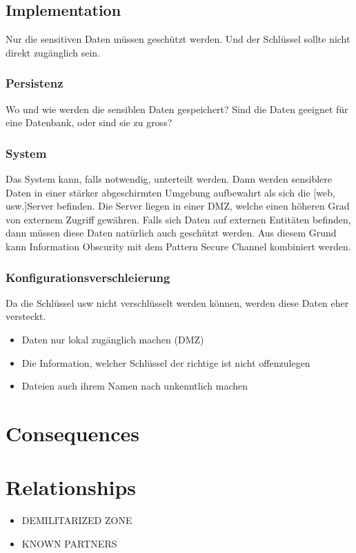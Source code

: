 \subsection{Implementation}
Nur die sensitiven Daten müssen geschützt werden. Und der Schlüssel sollte nicht direkt zugänglich sein.

\subsubsection{Persistenz}
Wo und wie werden die sensiblen Daten gespeichert? Sind die Daten geeignet für eine Datenbank, oder sind sie zu gross?

\subsubsection{System}
Das System kann, falls notwendig, unterteilt werden. Dann werden sensiblere Daten in einer stärker abgeschirmten Umgebung aufbewahrt als sich die [web, usw.]Server befinden. Die Server liegen in einer DMZ, welche einen höheren Grad von externem Zugriff gewähren.
Falls sich Daten auf externen Entitäten befinden, dann müssen diese Daten natürlich auch geschützt werden. Aus diesem Grund kann Information Obscurity mit dem Pattern Secure Channel kombiniert werden.

\subsubsection{Konfigurationsverschleierung}
Da die Schlüssel usw nicht verschlüsselt werden können, werden diese Daten eher versteckt.

\begin{itemize}
  \item Daten nur lokal zugänglich machen (DMZ)
  \item Die Information, welcher Schlüssel der richtige ist nicht offenzulegen
  \item Dateien auch ihrem Namen nach unkenntlich machen
\end{itemize}

\section{Consequences}
\begin{itemize}
\end{itemize}

\section{Relationships}
\begin{itemize}
  \item DEMILITARIZED ZONE
  \item KNOWN PARTNERS
\end{itemize}

